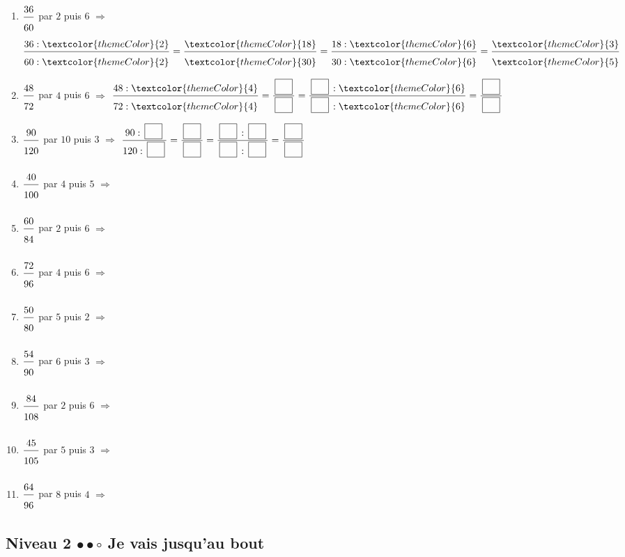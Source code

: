 \begin{enumerate}[leftmargin=*,align=parleft, label=\alph*), itemsep=9pt]
\item $\FA{36}{60}$ par $2$ puis $6$ \quad $\Longrightarrow$ \quad $\FA{36 : \textcolor{themeColor}{2}}{60 : \textcolor{themeColor}{2}}=\FA{\textcolor{themeColor}{18}}{\textcolor{themeColor}{30}}=\FA{18 : \textcolor{themeColor}{6}}{30 : \textcolor{themeColor}{6}}=\FA{\textcolor{themeColor}{3}}{\textcolor{themeColor}{5}}$
\item $\FA{48}{72}$ par $4$ puis $6$ \quad $\Longrightarrow$ \quad $\FA{48 : \textcolor{themeColor}{4}}{72 : \textcolor{themeColor}{4}}=\FA{\CaseC}{\CaseC}=\FA{\CaseC : \textcolor{themeColor}{6}}{\CaseC : \textcolor{themeColor}{6}}=\FA{\CaseC}{\CaseC}$
\item $\FA{90}{120}$ par $10$ puis $3$ \quad $\Longrightarrow$ \quad $\FA{90 : \CaseC}{120 : \CaseC}=\FA{\CaseC}{\CaseC}=\FA{\CaseC : \CaseC}{\CaseC : \CaseC}=\FA{\CaseC}{\CaseC}$
\item $\FA{40}{100}$ par $4$ puis $5$ \quad $\Longrightarrow$
\item $\FA{60}{84}$ par $2$ puis $6$ \quad $\Longrightarrow$
\item $\FA{72}{96}$ par $4$ puis $6$ \quad $\Longrightarrow$
\item $\FA{50}{80}$ par $5$ puis $2$ \quad $\Longrightarrow$
\item $\FA{54}{90}$ par $6$ puis $3$ \quad $\Longrightarrow$
\item $\FA{84}{108}$ par $2$ puis $6$ \quad $\Longrightarrow$
\item $\FA{45}{105}$ par $5$ puis $3$ \quad $\Longrightarrow$
\item $\FA{64}{96}$ par $8$ puis $4$ \quad $\Longrightarrow$
\end{enumerate}
 
\vspace{10pt}
\subsection{Niveau 2 \quad $\bullet\bullet\circ$ \quad Je vais jusqu'au bout}
 
 
